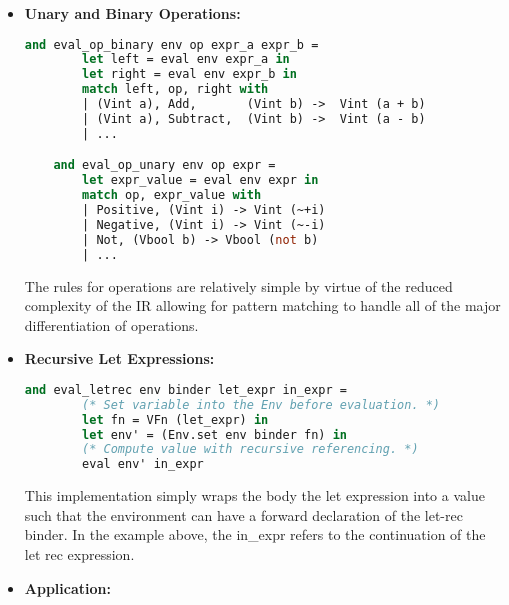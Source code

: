 \documentclass{l4proj}
\begin{document}
\begin{itemize}
    \item \textbf{Unary and Binary Operations:}
    
    \begin{lstlisting}[language=Caml, caption=Excerpt of the PyFunc Interpreter rules for binary and unary operations.]
    and eval_op_binary env op expr_a expr_b =
        let left = eval env expr_a in
        let right = eval env expr_b in
        match left, op, right with
        | (Vint a), Add,       (Vint b) ->  Vint (a + b)
        | (Vint a), Subtract,  (Vint b) ->  Vint (a - b)
        | ...

    and eval_op_unary env op expr = 
        let expr_value = eval env expr in
        match op, expr_value with
        | Positive, (Vint i) -> Vint (~+i)
        | Negative, (Vint i) -> Vint (~-i)
        | Not, (Vbool b) -> Vbool (not b)
        | ...
    \end{lstlisting}
    The rules for operations are relatively simple by virtue of the reduced complexity of the IR allowing for pattern matching to handle all of the major differentiation of operations.

    \item \textbf{Recursive Let Expressions:}
    
    \begin{lstlisting}[language=Caml, caption=The Pyfunc Interpreter let rec rule.]
    and eval_letrec env binder let_expr in_expr =
        (* Set variable into the Env before evaluation. *)
        let fn = VFn (let_expr) in
        let env' = (Env.set env binder fn) in
        (* Compute value with recursive referencing. *)
        eval env' in_expr
    \end{lstlisting}
    This implementation simply wraps the body the let expression into a value such that the environment can have a forward declaration of the let-rec binder.
    In the example above, the in\_expr refers to the continuation of the let rec expression.    

    \item \textbf{Application:}


\end{itemize}
\end{document}
